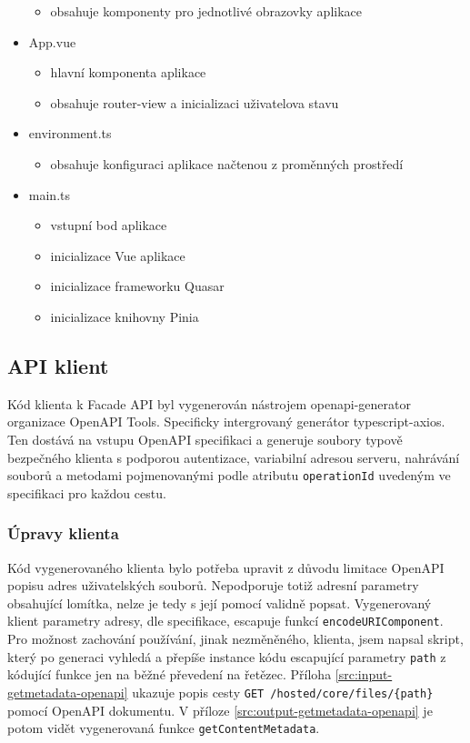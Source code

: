 \begin{itemize}
        \begin{itemize}
            \item obsahuje komponenty pro jednotlivé obrazovky aplikace
        \end{itemize}
    \item App.vue
        \begin{itemize}
            \item hlavní komponenta aplikace
            \item obsahuje router-view a inicializaci uživatelova stavu
        \end{itemize}
    \item environment.ts
        \begin{itemize}
            \item obsahuje konfiguraci aplikace načtenou z proměnných prostředí
        \end{itemize}
    \item main.ts
        \begin{itemize}
            \item vstupní bod aplikace
            \item inicializace Vue aplikace
            \item inicializace frameworku Quasar
            \item inicializace knihovny Pinia\cite{VuejsPinia2024}
        \end{itemize}
\end{itemize}

\subsection{API klient}
Kód klienta k Facade API byl vygenerován nástrojem openapi-generator organizace OpenAPI Tools. Specificky intergrovaný generátor typescript-axios. Ten dostává na vstupu OpenAPI specifikaci a generuje soubory typově bezpečného klienta s podporou autentizace, variabilní adresou serveru, nahrávání souborů a metodami pojmenovanými podle atributu \lstinline|operationId| uvedeným ve specifikaci pro každou cestu.

\subsubsection{Úpravy klienta}
Kód vygenerovaného klienta bylo potřeba upravit z důvodu limitace OpenAPI popisu adres uživatelských souborů. Nepodporuje totiž adresní parametry obsahující lomítka, nelze je tedy s její pomocí validně popsat. Vygenerovaný klient parametry adresy, dle specifikace, escapuje funkcí \lstinline|encodeURIComponent|. Pro možnost zachování používání, jinak nezměněného, klienta, jsem napsal skript, který po generaci vyhledá a přepíše instance kódu escapující parametry \lstinline|path| z kódující funkce jen na běžné převedení na řetězec. Příloha \ref{src:input-getmetadata-openapi} ukazuje popis cesty \lstinline|GET /hosted/core/files/{path}| pomocí OpenAPI dokumentu. V příloze \ref{src:output-getmetadata-openapi} je potom vidět vygenerovaná funkce \lstinline|getContentMetadata|.


